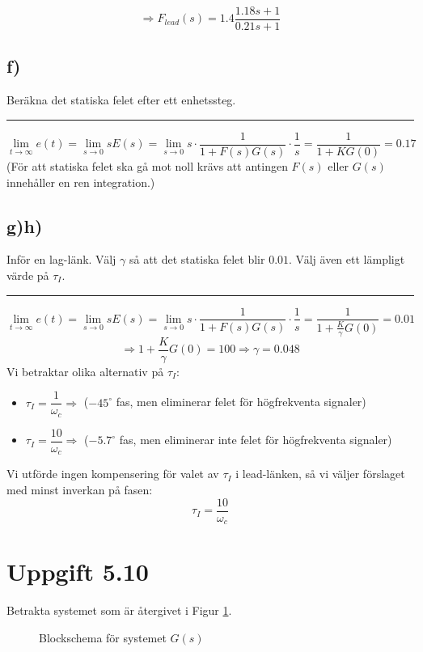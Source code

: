 \documentclass[12pt]{article}
\newcommand{\qline}{\hrule \vspace*{10pt}}
\begin{document}
\[\Rightarrow F_{lead}(s) = 1.4 \frac{1.18s+1}{0.21s+1}\]

\subsection*{f)}
Beräkna det statiska felet efter ett enhetssteg.
\qline

\[\lim_{t \to \infty}e(t) = \lim_{s \to 0} sE(s) = \lim_{s \to 0}s \cdot \frac{1}{1+F(s)G(s)} \cdot \frac{1}{s} = \frac{1}{1+KG(0)} = 0.17\]
(För att statiska felet ska gå mot noll krävs att antingen $F(s)$ eller $G(s)$ innehåller en ren integration.)

\subsection*{g)h)}
Inför en lag-länk. Välj $\gamma$ så att det statiska felet blir $0.01$. Välj även ett lämpligt värde på $\tau_I$.
\qline
\[\lim_{t \to \infty}e(t) = \lim_{s \to 0} sE(s) = \lim_{s \to 0}s \cdot \frac{1}{1+F(s)G(s)} \cdot \frac{1}{s} = \frac{1}{1+\frac{K}{\gamma}G(0)} = 0.01\] 
\[\Rightarrow 1+\frac{K}{\gamma}G(0) = 100 \Rightarrow \gamma = 0.048\]
Vi betraktar olika alternativ på $\tau_I$:
\begin{itemize}
\item $\tau_I = \dfrac{1}{\omega_c} \Rightarrow$ ($-45^{\circ}$ fas, men eliminerar felet för högfrekventa signaler)
\item $\tau_I = \dfrac{10}{\omega_c} \Rightarrow$ ($-5.7^{\circ}$ fas, men eliminerar inte felet för högfrekventa signaler)
\end{itemize}
Vi utförde ingen kompensering för valet av $\tau_I$ i lead-länken, så vi väljer förslaget med minst inverkan på fasen: 
\[\tau_I = \frac{10}{\omega_c}\]

\section*{Uppgift 5.10}
Betrakta systemet som är återgivet i Figur \ref{fig:5_10block}.

\begin{figure}[h!]
  \centering
  \caption{Blockschema för systemet $G(s)$}
  \label{fig:5_10block}
\end{figure}
\FloatBarrier
\end{document}
